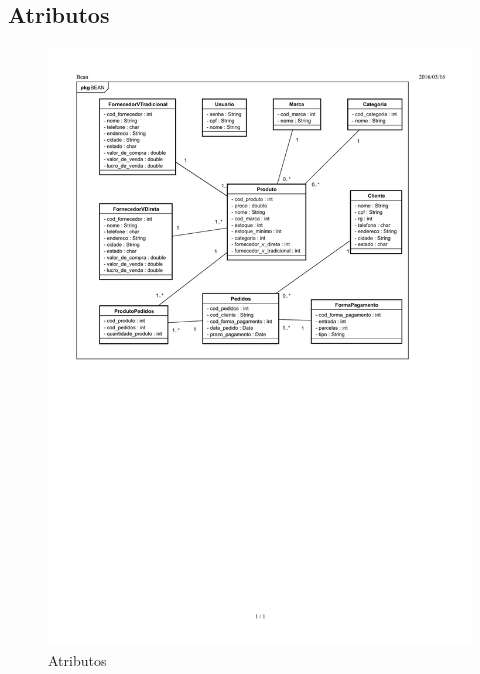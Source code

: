 \documentclass[chapter=TITLE,12pt,oneside,a4paper,english,french,sumario=tradicional,spanish,brazil,]{abntex2}
\begin{document}
\subsection{Atributos}
\begin{figure}[H]\centering
\includegraphics[scale=1.05]{atributos.pdf}\caption{Atributos\label{atr}}
\end{figure}

\newpage
\end{document}
